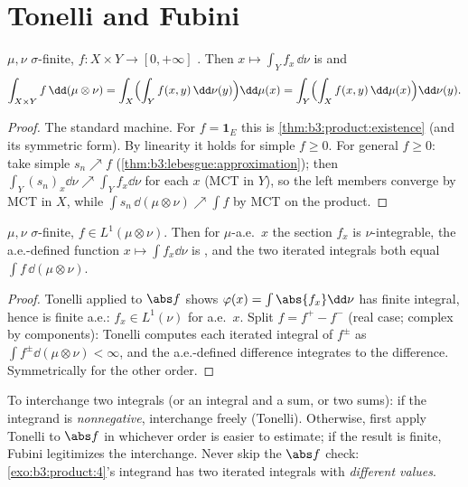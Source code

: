 \section{Tonelli and Fubini}

\begin{theorem}[Tonelli]\label{thm:b3:product:tonelli}
$\mu, \nu$ $\sigma$-finite, $f \colon X\times Y \to [0,
+\infty]$ . Then $x \mapsto \int_Y f_x\,\dd\nu$ is
 and
\[
\int_{X\times Y}f\,\dd(\mu\otimes\nu)
= \int_X\Bigl(\int_Y f(x,y)\,\dd\nu(y)\Bigr)\dd\mu(x)
= \int_Y\Bigl(\int_X f(x,y)\,\dd\mu(x)\Bigr)\dd\nu(y).
\]
\end{theorem}

\begin{proof}
The standard machine. For $f = \mathbf 1_E$ this is
\cref{thm:b3:product:existence} (and its symmetric form). By
linearity it holds for simple $f \geq 0$. For general $f \geq
0$: take simple $s_n \nearrow f$
(\cref{thm:b3:lebesgue:approximation}); then $\int_Y(s_n)_x
\dd\nu \nearrow \int_Y f_x\dd\nu$ for each $x$ (MCT in $Y$),
so the left members converge by MCT in $X$, while
$\int s_n\,\dd(\mu\otimes\nu) \nearrow \int f$ by MCT on the
product.
\end{proof}

\begin{theorem}[Fubini]\label{thm:b3:product:fubini}
$\mu, \nu$ $\sigma$-finite, $f \in L^1(\mu\otimes\nu)$. Then
for $\mu$-a.e.\ $x$ the section $f_x$ is $\nu$-integrable, the
a.e.-defined function $x \mapsto \int f_x\dd\nu$ is
, and the two iterated integrals both equal
$\int f\,\dd(\mu\otimes\nu)$.
\end{theorem}

\begin{proof}
Tonelli applied to $\abs f$ shows $\varphi(x) = \int\abs{f_x}
\dd\nu$ has finite integral, hence is finite a.e.: $f_x \in
L^1(\nu)$ for a.e.\ $x$. Split $f = f^+ - f^-$ (real case;
complex by components): Tonelli computes each iterated
integral of $f^\pm$ as $\int f^\pm\dd(\mu\otimes\nu) <
\infty$, and the a.e.-defined difference integrates to the
difference. Symmetrically for the other order.
\end{proof}

\begin{method}\label{met:b3:product:fubini}
To interchange two integrals (or an integral and a sum, or two
sums): if the integrand is \emph{nonnegative}, interchange
freely (Tonelli). Otherwise, first apply Tonelli to $\abs f$
in whichever order is easier to estimate; if the result is
finite, Fubini legitimizes the interchange. Never skip the
$\abs f$ check: \cref{exo:b3:product:4}'s integrand has two
iterated integrals with \emph{different values}.
\end{method}


